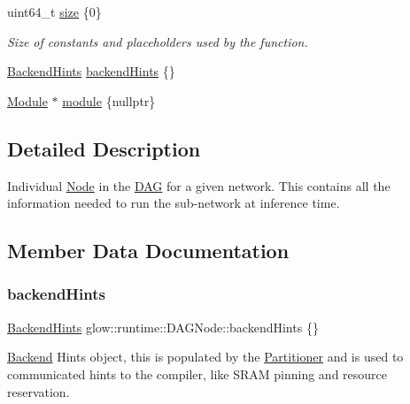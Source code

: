 \begin{DoxyCompactItemize}
\item 
\mbox{\label{structglow_1_1runtime_1_1_d_a_g_node_a7e223803837d7d338fea030e7cca6dea}} 
uint64\+\_\+t \hyperlink{structglow_1_1runtime_1_1_d_a_g_node_a7e223803837d7d338fea030e7cca6dea}{size} \{0\}
\begin{DoxyCompactList}\small\item\em Size of constants and placeholders used by the function. \end{DoxyCompactList}\item 
\hyperlink{structglow_1_1_backend_hints}{Backend\+Hints} \hyperlink{structglow_1_1runtime_1_1_d_a_g_node_a95a261201a4131e48a2931068844b4a9}{backend\+Hints} \{\}
\item 
\hyperlink{classglow_1_1_module}{Module} $\ast$ \hyperlink{structglow_1_1runtime_1_1_d_a_g_node_a9374ab2aed40d204c22539b94c3adcc5}{module} \{nullptr\}
\end{DoxyCompactItemize}


\subsection{Detailed Description}
Individual \hyperlink{classglow_1_1_node}{Node} in the \hyperlink{structglow_1_1runtime_1_1_d_a_g}{D\+AG} for a given network. This contains all the information needed to run the sub-\/network at inference time. 

\subsection{Member Data Documentation}
\mbox{\label{structglow_1_1runtime_1_1_d_a_g_node_a95a261201a4131e48a2931068844b4a9}} 
\subsubsection{\texorpdfstring{backend\+Hints}{backendHints}}
{\footnotesize\ttfamily \hyperlink{structglow_1_1_backend_hints}{Backend\+Hints} glow\+::runtime\+::\+D\+A\+G\+Node\+::backend\+Hints \{\}}

\hyperlink{classglow_1_1_backend}{Backend} Hints object, this is populated by the \hyperlink{classglow_1_1_partitioner}{Partitioner} and is used to communicated hints to the compiler, like S\+R\+AM pinning and resource reservation. \mbox{\label{structglow_1_1runtime_1_1_d_a_g_node_ad17c934bef11d35dafe4101c7baccd46}} 
